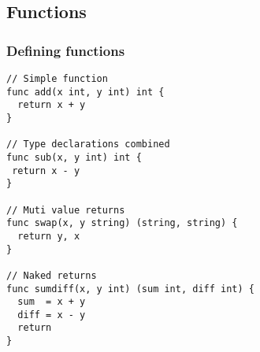 \subsection{Functions}
\subsubsection{Defining functions}
\begin{lstlisting}
// Simple function
func add(x int, y int) int {
  return x + y
}

// Type declarations combined
func sub(x, y int) int {
 return x - y
}

// Muti value returns
func swap(x, y string) (string, string) {
  return y, x
}

// Naked returns
func sumdiff(x, y int) (sum int, diff int) {
  sum  = x + y
  diff = x - y
  return
}

\end{lstlisting}
